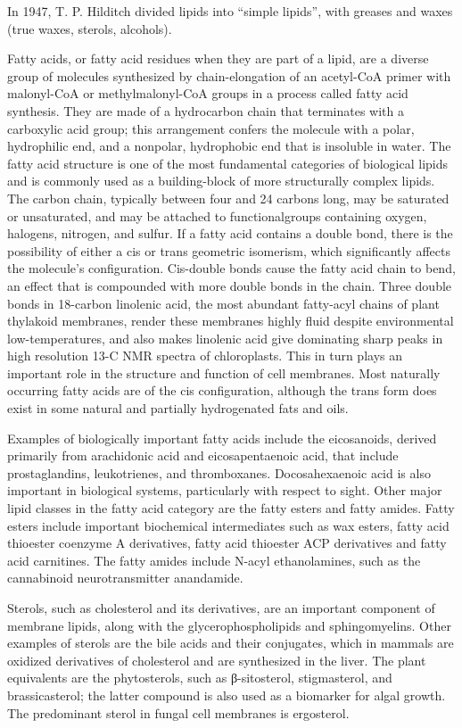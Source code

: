 In 1947, T. P. Hilditch divided lipids into ``simple lipids'', with
greases and waxes (true waxes, sterols, alcohols).

Fatty acids, or fatty acid residues when they are part of a lipid, are a
diverse group of molecules synthesized by chain-elongation of an
acetyl-CoA primer with malonyl-CoA or methylmalonyl-CoA groups in a
process called fatty acid synthesis. They are made of a hydrocarbon
chain that terminates with a carboxylic acid group; this arrangement
confers the molecule with a polar, hydrophilic end, and a nonpolar,
hydrophobic end that is insoluble in water. The fatty acid structure is
one of the most fundamental categories of biological lipids and is
commonly used as a building-block of more structurally complex lipids.
The carbon chain, typically between four and 24 carbons long, may be
saturated or unsaturated, and may be attached to functionalgroups
containing oxygen, halogens, nitrogen, and sulfur. If a fatty acid
contains a double bond, there is the possibility of either a cis or
trans geometric isomerism, which significantly affects the molecule's
configuration. Cis-double bonds cause the fatty acid chain to bend, an
effect that is compounded with more double bonds in the chain. Three
double bonds in 18-carbon linolenic acid, the most abundant fatty-acyl
chains of plant thylakoid membranes, render these membranes highly fluid
despite environmental low-temperatures, and also makes linolenic acid
give dominating sharp peaks in high resolution 13-C NMR spectra of
chloroplasts. This in turn plays an important role in the structure and
function of cell membranes. Most naturally occurring fatty acids are of
the cis configuration, although the trans form does exist in some
natural and partially hydrogenated fats and oils.

Examples of biologically important fatty acids include the eicosanoids,
derived primarily from arachidonic acid and eicosapentaenoic acid, that
include prostaglandins, leukotrienes, and thromboxanes. Docosahexaenoic
acid is also important in biological systems, particularly with respect
to sight. Other major lipid classes in the fatty acid category are the
fatty esters and fatty amides. Fatty esters include important
biochemical intermediates such as wax esters, fatty acid thioester
coenzyme A derivatives, fatty acid thioester ACP derivatives and fatty
acid carnitines. The fatty amides include N-acyl ethanolamines, such as
the cannabinoid neurotransmitter anandamide.

Sterols, such as cholesterol and its derivatives, are an important
component of membrane lipids, along with the glycerophospholipids and
sphingomyelins. Other examples of sterols are the bile acids and their
conjugates, which in mammals are oxidized derivatives of cholesterol and
are synthesized in the liver. The plant equivalents are the
phytosterols, such as β-sitosterol, stigmasterol, and brassicasterol;
the latter compound is also used as a biomarker for algal growth. The
predominant sterol in fungal cell membranes is ergosterol.

